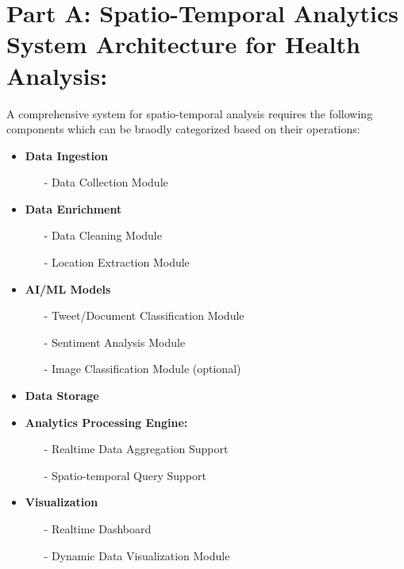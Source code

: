 \section{Part A: Spatio-Temporal Analytics System Architecture for Health Analysis:}
\label{part_a}
A comprehensive system for spatio-temporal analysis requires the following components which can be braodly categorized based on their operations:

\begin{itemize}
  \item \textbf{Data Ingestion}
    {\em
    \begin{itemize}
      \item[-] Data Collection Module
    \end{itemize}
    }
  \item \textbf{Data Enrichment}
    {\em
    \begin{itemize}
    \item[-] Data Cleaning Module
    \item[-] Location Extraction Module
    \end{itemize}
    }
  \item \textbf{AI/ML Models}
    {\em
    \begin{itemize}
      \item[-] Tweet/Document Classification Module
      \item[-] Sentiment Analysis Module
      \item[-] Image Classification Module (optional)
    \end{itemize}
    }
  \item \textbf{Data Storage}
  \item \textbf{Analytics Processing Engine:}
    {\em
    \begin{itemize}
      \item[-] Realtime Data Aggregation Support
      \item[-] Spatio-temporal Query Support
    \end{itemize}
    }
  \item \textbf{Visualization}
    {\em
    \begin{itemize}
      \item[-] Realtime Dashboard
      \item[-] Dynamic Data Visualization Module
    \end{itemize}
    }
\end{itemize}



